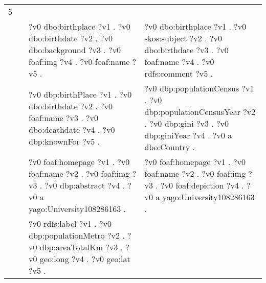 \begin{table}
{\begin{tabular}{!{\color{white}\vrule}l!{\color{white}\vrule}c@{\hs}!{\color{white}\vrule}p{11.5cm}!{\color{white}\vrule}p{11.5cm}!{\color{white}\vrule}}
			\midrule
			5 & \phantom{a} & \\
			 &  \phantom{a} &     ?v0 dbo:birthplace ?v1 .  ?v0 dbo:birthdate ?v2 .  ?v0 dbo:background ?v3 .  ?v0 foaf:img ?v4 .  ?v0 foaf:name ?v5 . &  ?v0 dbo:birthplace ?v1 .  ?v0 skos:subject ?v2 .  ?v0 dbo:birthdate ?v3 .  ?v0 foaf:name ?v4 .  ?v0 rdfs:comment ?v5 . \\
			 &  \phantom{a} &     ?v0 dbp:birthPlace ?v1 .  ?v0 dbo:birthdate ?v2 .  ?v0 foaf:name ?v3 .  ?v0 dbo:deathdate ?v4 .  ?v0 dbp:knownFor ?v5 . &  ?v0 dbp:populationCensus ?v1 .  ?v0 dbp:populationCensusYear ?v2 .  ?v0 dbp:gini ?v3 .  ?v0 dbp:giniYear ?v4 .  ?v0 a dbo:Country . \\
			 &  \phantom{a} &     ?v0 foaf:homepage ?v1 .  ?v0 foaf:name ?v2 .  ?v0 foaf:img ?v3 .  ?v0 dbp:abstract ?v4 .  ?v0 a yago:University108286163 . &  ?v0 foaf:homepage ?v1 .  ?v0 foaf:name ?v2 .  ?v0 foaf:img ?v3 .  ?v0 foaf:depiction ?v4 .  ?v0 a yago:University108286163 . \\
			 &  \phantom{a} &     ?v0 rdfs:label ?v1 .  ?v0 dbp:populationMetro ?v2 .  ?v0 dbp:areaTotalKm ?v3 .  ?v0 geo:long ?v4 .  ?v0 geo:lat ?v5 . & \\


\end{tabular}}
\end{table}
